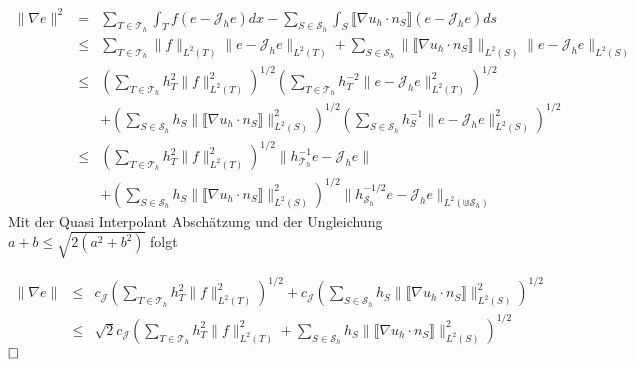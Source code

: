 \begin{eqnarray*}
	\|\nabla e\|^2 &=&  \sum_{T\in\mathscr{T}_h} \int_{T} f (e-\mathscr{J}_he)dx - \sum_{S\in\mathscr{S}_h} \int_{S} \llbracket \nabla u_h \cdot n_S\rrbracket (e-\mathscr{J}_he) ds \\
	&\leq&  \sum_{T\in\mathscr{T}_h}\|f\|_{L^2(T)} \|e-\mathscr{J}_he\|_{L^2(T)} + \sum_{S\in\mathscr{S}_h} \|\llbracket \nabla u_h \cdot n_S\rrbracket\|_{L^2(S)} \|e-\mathscr{J}_he\|_{L^2(S)}\\
	&\leq& \left( \sum_{T\in\mathscr{T}_h}h_T^2\|f\|_{L^2(T)}^2\right)^{1/2}\left( \sum_{T\in\mathscr{T}_h}h_T^{-2}\|e-\mathscr{J}_he\|_{L^2(T)}^2\right)^{1/2} \\
	&&+ \left(\sum_{S\in\mathscr{S}_h} h_S\|\llbracket \nabla u_h \cdot n_S\rrbracket\|_{L^2(S)}^2\right)^{1/2} \left(\sum_{S\in\mathscr{S}_h}h_S^{-1}\|e-\mathscr{J}_he\|_{L^2(S)}^2\right)^{1/2}\\
	&\leq& \left( \sum_{T\in\mathscr{T}_h}h_T^2\|f\|_{L^2(T)}^2\right)^{1/2}\|h_{\mathscr{T}_h}^{-1}e-\mathscr{J}_he\| \\
	&&+ \left(\sum_{S\in\mathscr{S}_h} h_S\|\llbracket \nabla u_h \cdot n_S\rrbracket\|_{L^2(S)}^2\right)^{1/2} \|h_{\mathscr{S}_h}^{-1/2}e-\mathscr{J}_he\|_{L^2(\Cup \mathscr{S}_h)}
\end{eqnarray*}
Mit der Quasi Interpolant Abschätzung und der Ungleichung $a+b\leq \sqrt{2(a^2+b^2)}$ folgt

\begin{eqnarray*}
 \|\nabla e\| &\leq& c_{\mathscr{J}}\left( \sum_{T\in\mathscr{T}_h}h_T^2\|f\|_{L^2(T)}^2\right)^{1/2}
+ c_{\mathscr{J}}\left(\sum_{S\in\mathscr{S}_h} h_S\|\llbracket \nabla u_h \cdot n_S\rrbracket\|_{L^2(S)}^2\right)^{1/2} \\
 &\leq& \sqrt{2}c_{\mathscr{J}}\left( \sum_{T\in\mathscr{T}_h}h_T^2\|f\|_{L^2(T)}^2
 + \sum_{S\in\mathscr{S}_h} h_S\|\llbracket \nabla u_h \cdot n_S\rrbracket\|_{L^2(S)}^2\right)^{1/2}
\end{eqnarray*}
$\hfill \Box$
